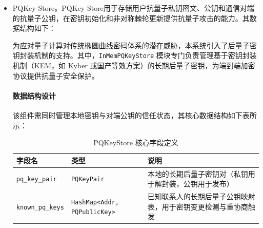 \begin{itemize}
\begin{lstlisting}[language=Rust, caption={\texttt{InMemPreKeyStore} 接口实现}, label=lst:prekey_impl]
        /// 存储预密钥，支持覆盖以保证状态一致性
        async fn save_pre_key(&mut self, id: PreKeyId, record: &PreKeyRecord) -> Result<()> {
            self.pre_keys.insert(id, record.to_owned());
            Ok(())
        }
    
        /// 删除已消耗的一次性预密钥，防止私钥复用
        async fn remove_pre_key(&mut self, id: PreKeyId) -> Result<()> {
            self.pre_keys.remove(&id);
            Ok(())
        }
    }
    \end{lstlisting}
    
    \paragraph{实现小结}
    \label{par:prekey_summary}
    在实现过程中，由于 One-Time PreKey 不参与身份认证，仅用于一次性密钥协商，其生命周期管理极为严格。通过 \texttt{all\_pre\_key\_ids} 接口，系统可定期审计本地预密钥池，并向服务器补充新密钥，从而在高并发会话请求下避免预密钥耗尽。若预密钥池枯竭，协议可能退化为仅使用长期身份密钥的非前向安全模式，因此密钥池健康监控是保障安全性的关键运维环节。

    \item PQKey Store。PQKey Store用于存储用户抗量子私钥密文、公钥和通信对端的抗量子公钥，在密钥初始化和非对称棘轮更新提供抗量子攻击的能力。其数据结构如下：

    为应对量子计算对传统椭圆曲线密码体系的潜在威胁，本系统引入了后量子密钥封装机制的支持。其中，\texttt{InMemPQKeyStore} 模块专门负责管理基于密钥封装机制（KEM，如 Kyber 或国产等效方案）的长期后量子密钥，为端到端加密协议提供抗量子安全保护。
    
    \paragraph{数据结构设计}
    \label{subsec:pq_data_structure}
    该组件需同时管理本地密钥与对端公钥的信任状态，其核心数据结构如下表所示：
    
    \begin{table}[htbp]
    \centering
    \caption{PQKeyStore 核心字段定义}
    \label{tab:pq_keystore_fields}
    \small
    \begin{tabular}{@{}l l p{5.8cm}@{}}
    \toprule
    \textbf{字段名} & \textbf{类型} & \textbf{说明} \\
    \midrule
    \texttt{pq\_key\_pair} & \texttt{PQKeyPair} & 本地的长期后量子密钥对（私钥用于解封装，公钥用于发布） \\
    \texttt{known\_pq\_keys} & \texttt{HashMap<Addr, PQPublicKey>} & 已知联系人的长期后量子公钥映射表，用于密钥变更检测与重协商触发 \\
    \bottomrule
    \end{tabular}
    \end{table}
    

\end{itemize}
